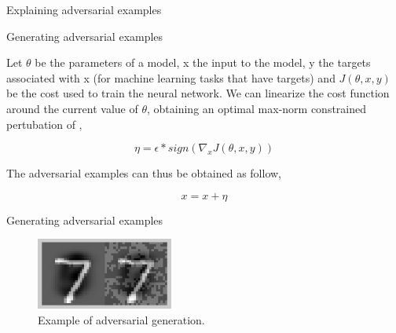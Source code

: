 \begin{tframe}{Explaining adversarial examples}



\end{tframe}


\begin{tframe}{Generating adversarial examples}

Let $\theta$ be the parameters of a model, x the input to the model, y the targets associated with x (for machine learning tasks that have targets) and $J(\theta, x, y)$ be the cost used to train the neural network. 
We can linearize the cost function around the current value of $\theta$, obtaining an optimal max-norm constrained pertubation of ,

$$ \eta = \epsilon * sign(\nabla_x J(\theta, x, y)) $$

The adversarial examples can thus be obtained as follow,

$$ x = x + \eta $$


\end{tframe}


\begin{tframe}{Generating adversarial examples}

\vspace{0.1in}
\vspace{0.1in}
\vspace{0.1in}

\begin{figure}
  \includegraphics[width=0.4\textwidth]{img/clean-adv.png}
  \caption{Example of adversarial generation.}
\end{figure}

\end{tframe}